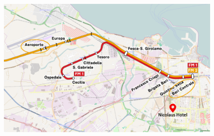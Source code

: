 \documentclass[
	openany, %
	parskip=full, %
	12pt, %
	a4paper, %
]{conferencebooklet} %
\begin{document}
\newpage
\begin{adjustwidth}{10pt}{20pt}
\begin{figure}[h!]
    \centering
    \includegraphics[width=0.6\linewidth]{images/useful_info/nicolaus/1920px-Bari_mappa_linee_FM.png}
\end{figure}

\begin{table}[h!]
\end{table}
\end{adjustwidth}
\end{document}
